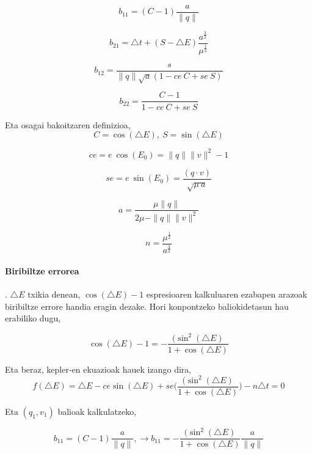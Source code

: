\begin{equation*}
b_{11}=(C-1) \frac{a}{\|q\|}
\end{equation*}

\begin{equation*}
b_{21}=\triangle t+(S-\triangle E) \frac{a^{\frac{3}{2}}}{\mu^{\frac{1}{2}}}
\end{equation*}

\begin{equation*}
b_{12}=\frac{s}{\|q\| \sqrt{a} (1-ce \ C +se \ S)}
\end{equation*}

\begin{equation*}
b_{22}=\frac{C-1}{1-ce \ C+ se \ S}
\end{equation*}

Eta osagai bakoitzaren definizioa,
\begin{equation*}
C=\cos(\triangle E), \ S=\sin(\triangle E)
\end{equation*}

\begin{equation*}
ce=e \ \cos(E_0) = \|q\| \|v\|^2-1
\end{equation*}

\begin{equation*}
se= e \ \sin(E_0)=\frac{(q \cdot v)}{\sqrt{\mu \ a}}
\end{equation*}

\begin{equation*}
a= \frac{\mu \|q\|}{2\mu-\|q\|\|v\|^2}
\end{equation*}

\begin{equation*}
n= \frac{\mu^{\frac{1}{2}}}{a^{\frac{3}{2}}}
\end{equation*}

\paragraph*{\textbf{Biribiltze errorea}}. $\triangle E$ txikia denean, $\cos(\triangle E)-1$ espresioaren kalkuluaren ezabapen arazoak biribiltze errore handia eragin dezake. Hori konpontzeko baliokidetasun hau erabiliko dugu,

\begin{equation*}
\cos(\triangle E)-1=-\frac{(\sin^2(\triangle E)}{1+\cos(\triangle E)}
\end{equation*}  

Eta beraz, kepler-en ekuazioak hauek izango dira,
\begin{equation*}
f(\triangle E)=\triangle E - ce \sin(\triangle E)+ se \bigg(\frac{(\sin^2(\triangle E)}{1+\cos(\triangle E)}\bigg)-n \triangle t=0
\end{equation*}

Eta $(q_1,v_1)$ balioak kalkulatzeko,

\begin{equation*}
b_{11}=(C-1) \frac{a}{\|q\|}, \longrightarrow b_{11}=-\frac{(\sin^2(\triangle E)}{1+\cos(\triangle E)} \frac{a}{\|q\|}
\end{equation*}

